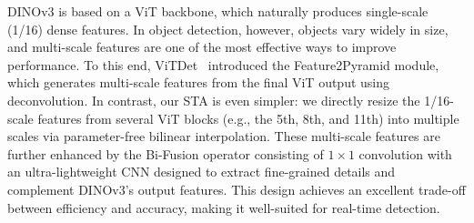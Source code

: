 DINOv3 is based on a ViT backbone, which naturally produces single-scale (1/16) dense features. In object detection, however, objects vary widely in size, and multi-scale features are one of the most effective ways to improve performance. To this end, ViTDet~\cite{li2022exploring} introduced the Feature2Pyramid module, which generates multi-scale features from the final ViT output using deconvolution. In contrast, our STA is even simpler: we directly resize the 1/16-scale features from several ViT blocks (e.g., the 5th, 8th, and 11th) into multiple scales via parameter-free bilinear interpolation. These multi-scale features are further enhanced by the Bi-Fusion operator consisting of $1\times1$ convolution with an ultra-lightweight CNN designed to extract fine-grained details and complement DINOv3’s output features. This design achieves an excellent trade-off between efficiency and accuracy, making it well-suited for real-time detection.






